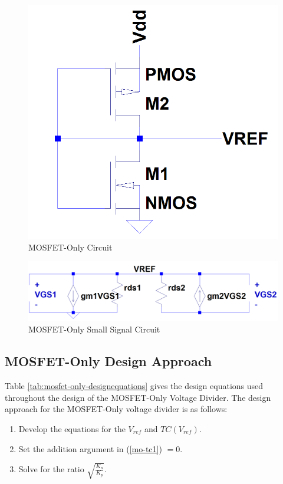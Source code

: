 \documentclass[conference]{IEEEtran}
\begin{document}
\begin{figure}[!htbp]
  \centering
  \includegraphics[scale=0.25]{images/mosfet-only1.png}
  \caption[mosfet-only1]{MOSFET-Only Circuit}
  \label{fig:mosfet-only1}
\end{figure}

\begin{figure}[!htbp]
  \centering
  \includegraphics[scale=0.25]{images/mosfet-only1-ss.png}
  \caption[mosfet-only1-ss]{MOSFET-Only Small Signal Circuit}
  \label{fig:mosfet-only1-ss}
\end{figure}
\subsection{MOSFET-Only Design Approach}
Table \ref{tab:mosfet-only-designequations} gives the design equations used throughout the design of the MOSFET-Only Voltage Divider.  The design approach for the MOSFET-Only voltage divider is as follows:
\begin{enumerate}
  \item Develop the equations for the $V_{ref}$ and $TC(V_{ref})$.
  \item Set the addition argument in (\ref{mo-tc1}) $=0$.
  \item Solve for the ratio $\sqrt{\frac{K_n}{K_p}}$.
\end{enumerate}
\end{document}
